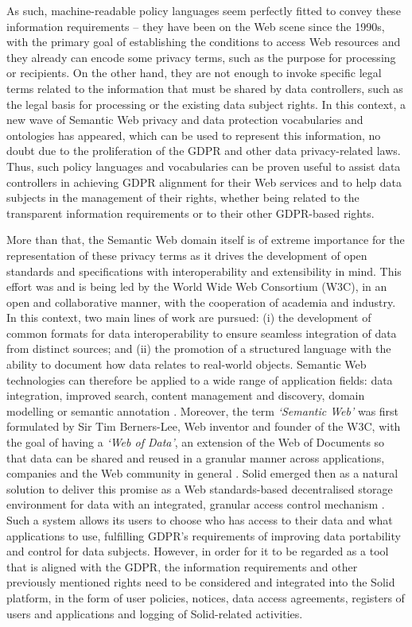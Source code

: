 As such, machine-readable policy languages seem perfectly fitted to convey these information requirements -- they have been on the Web scene since the 1990s, with the primary goal of establishing the conditions to access Web resources and they already can encode some privacy terms, such as the purpose for processing or recipients.
On the other hand, they are not enough to invoke specific legal terms related to the information that must be shared by data controllers, such as the legal basis for processing or the existing data subject rights.
In this context, a new wave of Semantic Web privacy and data protection vocabularies and ontologies has appeared, which can be used to represent this information, no doubt due to the proliferation of the GDPR and other data privacy-related laws.
Thus, such policy languages and vocabularies can be proven useful to assist data controllers in achieving GDPR alignment for their Web services and to help data subjects in the management of their rights, whether being related to the transparent information requirements or to their other GDPR-based rights.

More than that, the Semantic Web domain itself is of extreme importance for the representation of these privacy terms as it drives the development of open standards and specifications with interoperability and extensibility in mind.
This effort was and is being led by the World Wide Web Consortium (W3C), in an open and collaborative manner, with the cooperation of academia and industry.
In this context, two main lines of work are pursued: (i) the development of common formats for data interoperability to ensure seamless integration of data from distinct sources; and (ii) the promotion of a structured language with the ability to document how data relates to real-world objects.
Semantic Web technologies can therefore be applied to a wide range of application fields: data integration, improved search, content management and discovery, domain modelling or semantic annotation \citeyearpar{noauthor_semantic_2012}.
Moreover, the term \textit{`Semantic Web'} was first formulated by Sir Tim Berners-Lee, Web inventor and founder of the W3C, with the goal of having a \textit{`Web of Data'}, an extension of the Web of Documents so that data can be shared and reused in a granular manner across applications, companies and the Web community in general \citep{berners-lee_semantic_2001}.
Solid emerged then as a natural solution to deliver this promise as a Web standards-based decentralised storage environment for data with an integrated, granular access control mechanism \citep{sambra_solid_2016}.
Such a system allows its users to choose who has access to their data and what applications to use, fulfilling GDPR's requirements of improving data portability and control for data subjects.
However, in order for it to be regarded as a tool that is aligned with the GDPR, the information requirements and other previously mentioned rights need to be considered and integrated into the Solid platform, in the form of user policies, notices, data access agreements, registers of users and applications and logging of Solid-related activities.